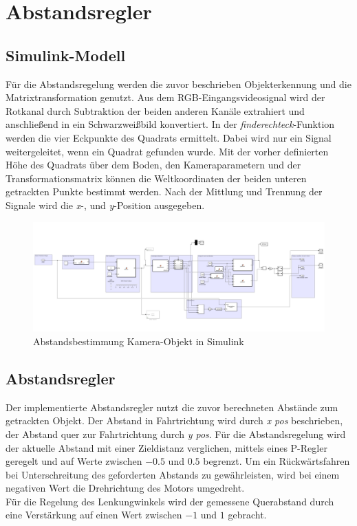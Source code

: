 \section{Abstandsregler}
\subsection{Simulink-Modell}
Für die Abstandsregelung werden die zuvor beschrieben Objekterkennung und die Matrixtransformation genutzt. 
Aus dem RGB-Eingangsvideosignal wird der Rotkanal durch Subtraktion der beiden anderen Kanäle extrahiert und anschließend in ein Schwarzweißbild konvertiert.
%
In der \textit{finderechteck}-Funktion werden die vier Eckpunkte des Quadrats ermittelt. Dabei wird nur ein Signal weitergeleitet, wenn ein Quadrat gefunden wurde. 
%
Mit der vorher definierten Höhe des Quadrats über dem Boden,   den Kameraparametern und der Transformationsmatrix können die Weltkoordinaten der beiden unteren getrackten Punkte bestimmt werden. Nach der Mittlung und Trennung der Signale wird die \textit{x}-, und \textit{y}-Position ausgegeben. 



\begin{figure}[h]
	\centering
	\includegraphics[width=1.1\textwidth]{Figures/Simulink.PNG}
	\caption{Abstandsbestimmung Kamera-Objekt in Simulink} 
	\label{img:grafik-dummy}
\end{figure}

\subsection{Abstandsregler}
Der implementierte Abstandsregler nutzt die zuvor berechneten Abstände zum getrackten Objekt. Der Abstand in Fahrtrichtung wird durch \textit{x pos} beschrieben, der Abstand quer zur Fahrtrichtung durch \textit{y pos}. 
Für die Abstandsregelung wird der aktuelle Abstand mit einer Zieldistanz verglichen,  mittels eines P-Regler geregelt und auf Werte zwischen $-0.5$ und $0.5$ begrenzt. 
Um ein Rückwärtsfahren bei Unterschreitung des geforderten Abstands zu gewährleisten, wird bei einem negativen Wert die Drehrichtung des Motors umgedreht. \\
%
Für die Regelung des Lenkungwinkels wird der gemessene  Querabstand durch eine Verstärkung auf einen Wert zwischen $-1$ und $1$ gebracht. 


